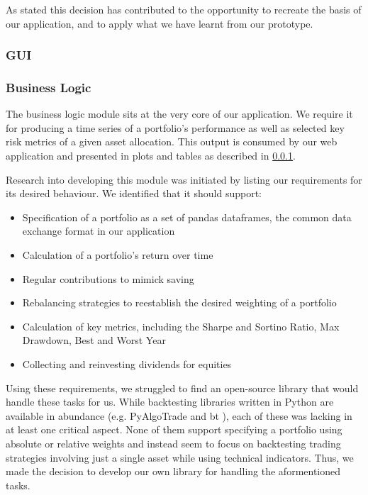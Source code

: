 \documentclass[main.tex]{subfiles}
\begin{document}
As stated this decision has contributed to the opportunity to recreate the basis of our application, and to apply what we have learnt from our prototype. 

\subsubsection{GUI}

\label{GUI}
\subsubsection{Business Logic}
\label{BL}

The business logic module sits at the very core of our application. We require it for producing a time series of a portfolio's performance as well as selected key risk metrics of a given asset allocation. This output is consumed by our web application and presented in plots and tables as described in \ref{GUI}. 

Research into developing this module was initiated by listing our requirements for its desired behaviour. We identified that it should support:

\begin{itemize}
	\item Specification of a portfolio as a set of pandas dataframes, the common data exchange format in our application
	\item Calculation of a portfolio's return over time
	\item Regular contributions to mimick saving
	\item Rebalancing strategies to reestablish the desired weighting of a portfolio
	\item Calculation of key metrics, including the Sharpe and Sortino Ratio, Max Drawdown, Best and Worst Year
	\item Collecting and reinvesting dividends for equities
\end{itemize}

Using these requirements, we struggled to find an open-source library that would handle these tasks for us. While backtesting libraries written in Python are available in abundance (e.g. PyAlgoTrade \cite{PyAlgoTrade} and bt \cite{bt}), each of these was lacking in at least one critical aspect. None of them support specifying a portfolio using absolute or relative weights and instead seem to focus on backtesting trading strategies involving just a single asset while using technical indicators. Thus, we made the decision to develop our own library for handling the aformentioned tasks.
\end{document}
